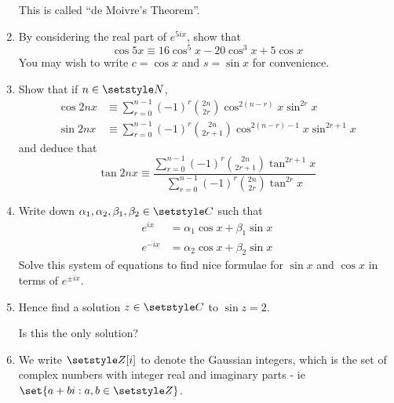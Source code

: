 \begin{enumerate}
  This is called ``de Moivre's Theorem''.
 \item
  By considering the real part of \(e^{5ix}\), show that
  \begin{equation*}
   \cos 5x \equiv 16\cos^5 x - 20\cos^3 x + 5\cos x
  \end{equation*}
  You may wish to write \(c = \cos x\) and \(s = \sin x\) for convenience.
 \item
  Show that if \(n \in \Naturals\),
  \begin{align*}
   \cos 2nx &\equiv
    \sum_{r = 0}^{n - 1}
     (-1)^r \binom{2n}{2r} \cos^{2(n - r)} x \sin^{2r} x \\
   \sin 2nx &\equiv
    \sum_{r = 0}^{n - 1}
     (-1)^r \binom{2n}{2r + 1} \cos^{2(n - r) - 1} x \sin^{2r + 1} x
  \end{align*}
  and deduce that
  \begin{equation*}
   \tan 2nx \equiv
   \frac{\sum_{r = 0}^{n - 1} (-1)^r \binom{2n}{2r + 1} \tan^{2r + 1} x}
        {\sum_{r = 0}^{n - 1} (-1)^r \binom{2n}{2r} \tan^{2r} x}
  \end{equation*}
 \item
  Write down \(\alpha_1, \alpha_2, \beta_1, \beta_2 \in \Complex\) such that
  \begin{align*}
   e^{ix} &= \alpha_1 \cos x + \beta_1 \sin x \\
   e^{-ix} &= \alpha_2 \cos x + \beta_2 \sin x
  \end{align*}
  Solve this system of equations to find nice formulae for
  \(\sin x\) and \(\cos x\) in terms of \(e^{\pm ix}\).
 \item
  Hence find a solution \(z \in \Complex\) to \(\sin z = 2\).

  Is this the only solution?
 \item
  We write \(\Integers[i]\) to denote the Gaussian integers, which is the set of
  complex numbers with integer real and imaginary parts - ie
  \(\set{a + bi : a, b \in \Integers}\).


\end{enumerate}

